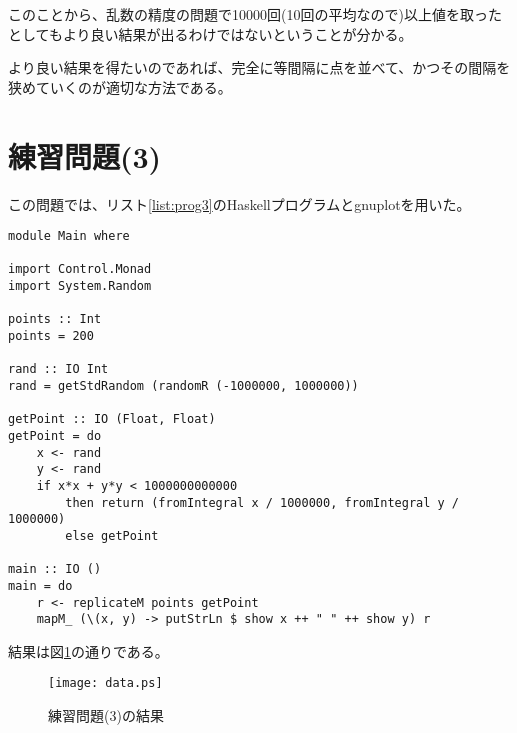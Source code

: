 \documentclass{jsarticle}
\begin{document}
このことから、乱数の精度の問題で10000回(10回の平均なので)以上値を取ったとしてもより良い結果が出るわけではないということが分かる。

より良い結果を得たいのであれば、完全に等間隔に点を並べて、かつその間隔を狭めていくのが適切な方法である。

\section{練習問題(3)}

この問題では、リスト\ref{list:prog3}のHaskellプログラムとgnuplotを用いた。

\begin{lstlisting}[label=list:prog3, caption=練習問題(3)のプログラム]
module Main where

import Control.Monad
import System.Random

points :: Int
points = 200

rand :: IO Int
rand = getStdRandom (randomR (-1000000, 1000000))

getPoint :: IO (Float, Float)
getPoint = do
    x <- rand
    y <- rand
    if x*x + y*y < 1000000000000
        then return (fromIntegral x / 1000000, fromIntegral y / 1000000)
        else getPoint

main :: IO ()
main = do
    r <- replicateM points getPoint
    mapM_ (\(x, y) -> putStrLn $ show x ++ " " ++ show y) r
\end{lstlisting}

結果は図\ref{fig:prog3}の通りである。

\begin{figure}[htbp]

\begin{center}
\texttt{[image: data.ps]}
\end{center}

\caption{練習問題(3)の結果}
\label{fig:prog3}

\end{figure}
\end{document}
